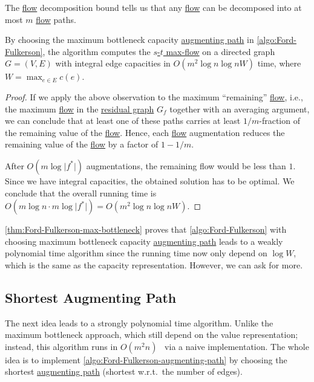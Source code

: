 \begin{prev}
	The \hyperref[def:flow]{flow} decomposition bound tells us that any \hyperref[def:flow]{flow} can be decomposed into at most \(m\) \hyperref[def:flow]{flow} paths.
\end{prev}

\begin{theorem}\label{thm:Ford-Fulkerson-max-bottleneck}
	By choosing the maximum bottleneck capacity \hyperref[def:augmenting-path]{augmenting path} in \autoref{algo:Ford-Fulkerson}, the algorithm computes the \hyperref[prb:s-t-max-flow]{\(s\)-\(t\) max-flow} on a directed graph \(G = (V, E)\) with integral edge capacities in \(O(m^2 \log n \log nW)\) time, where \(W = \max _{e \in E} c(e)\).
\end{theorem}
\begin{proof}
	If we apply the above observation to the maximum ``remaining'' \hyperref[def:flow]{flow}, i.e., the maximum \hyperref[def:flow]{flow} in the \hyperref[def:residual-graph]{residual graph} \(G_f\) together with an averaging argument, we can conclude that at least one of these paths carries at least \(1 / m\)-fraction of the remaining value of the \hyperref[def:flow]{flow}. Hence, each \hyperref[def:flow]{flow} augmentation reduces the remaining value of the \hyperref[def:flow]{flow} by a factor of \(1 - 1 / m\).

	After \(O(m \log \lvert f^{\ast} \rvert )\) augmentations, the remaining flow would be less than \(1\). Since we have integral capacities, the obtained solution has to be optimal. We conclude that the overall running time is \(O(m \log n \cdot m \log \lvert f^{\ast} \rvert ) = O(m^2 \log n \log nW)\).
\end{proof}

\autoref{thm:Ford-Fulkerson-max-bottleneck} proves that \autoref{algo:Ford-Fulkerson} with choosing maximum bottleneck capacity \hyperref[def:augmenting-path]{augmenting path} leads to a weakly polynomial time algorithm since the running time now only depend on \(\log W\), which is the same as the capacity representation. However, we can ask for more.

\subsection{Shortest Augmenting Path}
The next idea leads to a strongly polynomial time algorithm. Unlike the maximum bottleneck approach, which still depend on the value representation; instead, this algorithm runs in \(O(m^2 n)\)~\cite{edmonds1972theoretical} via a naive implementation. The whole idea is to implement \autoref{algo:Ford-Fulkerson-augmenting-path} by choosing the shortest \hyperref[def:augmenting-path]{augmenting path} (shortest w.r.t.\ the number of edges).

